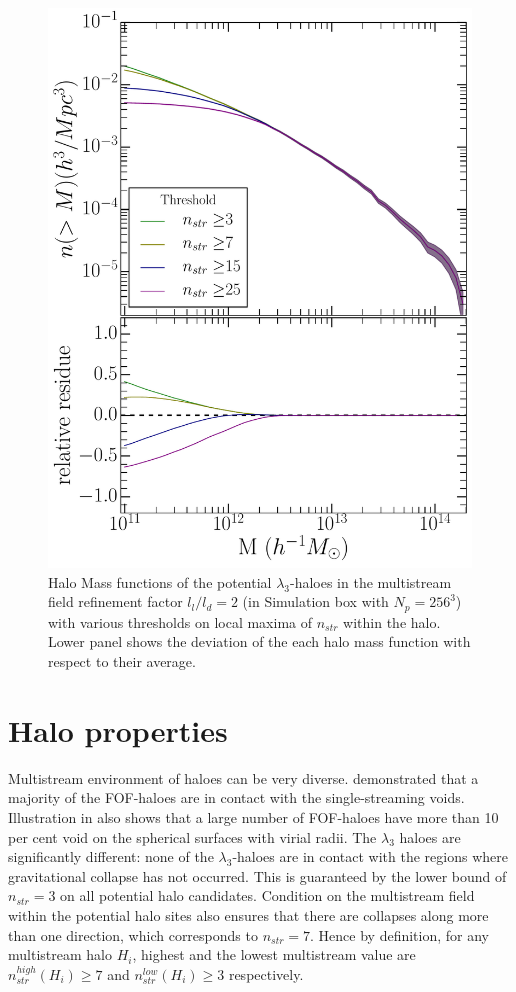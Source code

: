 \documentclass[fleqn,usenatbib,useAMS]{mnras}
\begin{document}
\begin{figure}
\begin{minipage}[t]{.99\linewidth}
 \centering\includegraphics[width=8.cm]{fig7.pdf} 
\end{minipage}\hfill
\caption{Halo Mass functions of the potential $\lambda_3$-haloes in the multistream field refinement factor $l_l/l_d = 2$ (in Simulation box with $N_p = 256^3$) with various thresholds on local maxima of $n_{str}$ within the halo. Lower panel shows the deviation of the each halo mass function with respect to their average.}
\label{fig:hmfEth}
\end{figure}


\section{Halo properties}
\label{sub:HaloProperties}

Multistream environment of haloes can be very diverse. \cite{Ramachandra2015} demonstrated that a majority of the FOF-haloes are in contact with the single-streaming voids. Illustration in \cite{Ramachandra2017} also shows that a large number of FOF-haloes have more than 10 per cent void on the spherical surfaces with virial radii. The $\lambda_3$ haloes are significantly different: none of the $\lambda_3$-haloes are in contact with the regions where gravitational collapse has not occurred. This is guaranteed by the lower bound of $n_{str} = 3$ on all potential halo candidates. Condition on the multistream field within the potential halo sites also ensures that there are collapses along more than one direction, which corresponds to $n_{str} = 7$. Hence by definition, for any multistream halo $H_i$, highest and the lowest multistream value are $n_{str}^{high}(H_i) \geq 7$ and $n_{str}^{low}(H_i) \geq 3$ respectively. 
\end{document}
